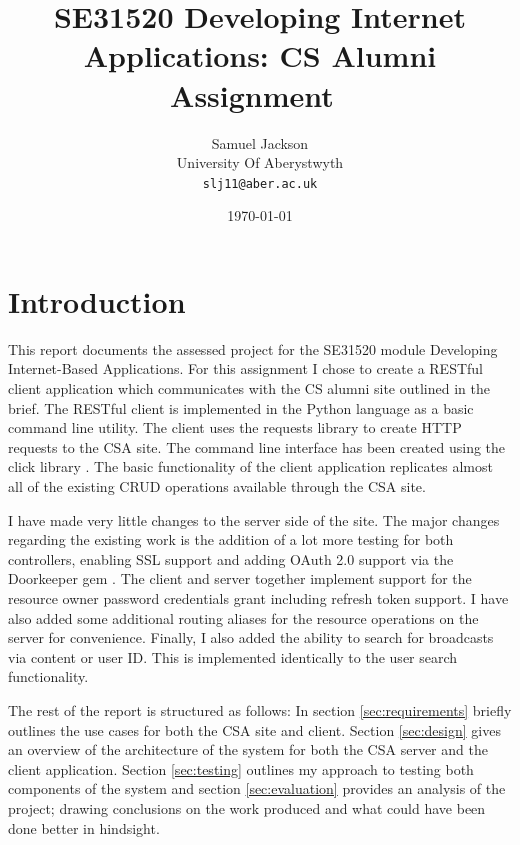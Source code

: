 \documentclass[paper=a4, fontsize=11pt]{scrartcl}	%
\title{
	\vspace{-0.5in} 	\usefont{OT1}{bch}{b}{n}
	 SE31520 Developing Internet Applications: CS Alumni Assignment\
}
\author{
	\usefont{OT1}{bch}{m}{n} Samuel Jackson
	\\ \usefont{OT1}{bch}{m}{n} University Of Aberystwyth
	\\   \texttt{slj11@aber.ac.uk}
}
\date{\today}
\numberwithin{equation}{section}															%
\numberwithin{figure}{section}																%
\numberwithin{table}{section}
\begin{document}
\maketitle
\clearpage

\section{Introduction}
This report documents the assessed project for the SE31520 module Developing Internet-Based Applications. For this assignment I chose to create a RESTful client application which communicates with the CS alumni site outlined in the brief. The RESTful client is implemented in the Python language as a basic command line utility. The client uses the requests library \cite{libraryRequests} to create HTTP requests to the CSA site. The command line interface has been created using the click library \cite{libraryClick}. The basic functionality of the client application replicates almost all of the existing CRUD operations available through the CSA site. 

I have made very little changes to the server side of the site. The major changes regarding the existing work is the addition of a lot more testing for both controllers, enabling SSL support and adding OAuth 2.0 \cite{rfc6749} support via the Doorkeeper gem \cite{libraryDoorkeeper}. The client and server together implement support for the resource owner password credentials grant \cite{rfc6749resourceOwner} including refresh token support. I have also added some additional routing aliases for the resource operations on the server for convenience. Finally, I also added the ability to search for broadcasts via content or user ID. This is implemented identically to the user search functionality.

The rest of the report is structured as follows: In section \ref{sec:requirements} briefly outlines the use cases for both the CSA site and client. Section \ref{sec:design} gives an overview of the architecture of the system for both the CSA server and the client application. Section \ref{sec:testing} outlines my approach to testing both components of the system and section \ref{sec:evaluation} provides an analysis of the project; drawing conclusions on the work produced and what could have been done better in hindsight.
\end{document}
